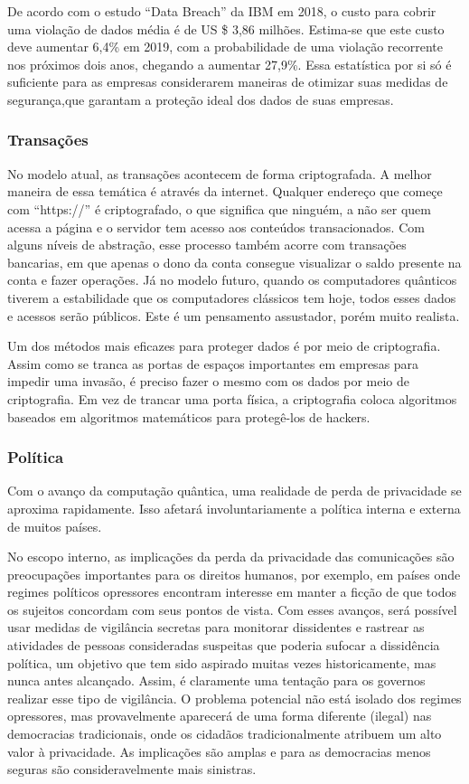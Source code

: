 De acordo com o estudo “Data Breach” da IBM em 2018, o custo para cobrir uma violação de dados média é de US \$ 3,86 milhões. Estima-se que este custo deve aumentar 6,4\% em 2019, com a probabilidade de uma violação recorrente nos próximos dois anos, chegando a aumentar 27,9\%. Essa estatística por si só é suficiente para as empresas considerarem maneiras de otimizar suas medidas de segurança,que garantam a proteção ideal dos dados de suas empresas.

\subsubsection{Transações}
No modelo atual, as transações acontecem de forma criptografada. A melhor maneira de essa temática é através da internet. Qualquer endereço que começe com “https://” é criptografado, o que significa que ninguém, a não ser quem acessa a página e o servidor tem acesso aos conteúdos transacionados. Com alguns níveis de abstração, esse processo também acorre com transações bancarias, em que apenas o dono da conta consegue visualizar o saldo presente na conta e fazer operações. Já no modelo futuro, quando os computadores quânticos tiverem a estabilidade que os computadores clássicos tem hoje, todos esses dados e acessos serão públicos. Este é um pensamento assustador, porém muito realista.

Um dos métodos mais eficazes para proteger dados é por meio de criptografia. Assim como se tranca as portas de espaços importantes em empresas para impedir uma invasão, é preciso fazer o mesmo com os dados por meio de criptografia. Em vez de trancar uma porta física, a criptografia coloca algoritmos baseados em algoritmos matemáticos para protegê-los de hackers.


\subsubsection{Política}
Com o avanço da computação quântica, uma realidade de perda de privacidade se aproxima rapidamente. Isso afetará involuntariamente a política interna e externa de muitos países. 

No escopo interno, as implicações da perda da privacidade das comunicações são preocupações importantes para os direitos humanos, por exemplo, em países onde regimes políticos opressores encontram interesse em manter a ficção de que todos os sujeitos concordam com seus pontos de vista. Com esses avanços, será possível usar medidas de vigilância secretas para monitorar dissidentes e rastrear as atividades de pessoas consideradas suspeitas que poderia sufocar a dissidência política, um objetivo que tem sido aspirado muitas vezes historicamente, mas nunca antes alcançado.  Assim, é claramente uma tentação para os governos realizar esse tipo de vigilância. O problema potencial não está isolado dos regimes opressores, mas provavelmente aparecerá de uma forma diferente (ilegal) nas democracias tradicionais, onde os cidadãos tradicionalmente atribuem um alto valor à privacidade. As implicações são amplas e para as democracias menos seguras são consideravelmente mais sinistras.

